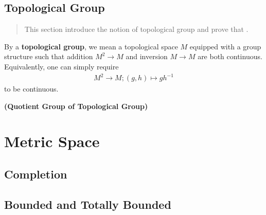 \documentclass{report}
\begin{document}
\section{Topological Group}
\begin{abstract}
This section introduce the notion of topological group 
and prove that .  
\end{abstract}
\begin{mdframed}
By a \textbf{topological group}, we mean a topological space $M$ equipped with a group structure such that addition $M^2 \rightarrow M$ and inversion $M\rightarrow M$ are both continuous. Equivalently, one can simply require 
\begin{align*}
  M^2\rightarrow M;(g,h)\mapsto gh^{-1}
\end{align*}
to be continuous. 
\end{mdframed}

\begin{theorem}
\label{Quotient Group of Topological Group}
\textbf{(Quotient Group of Topological Group)}
\end{theorem}
\chapter{Metric Space}
\section{Completion}
\section{Bounded and Totally Bounded}
\end{document}

